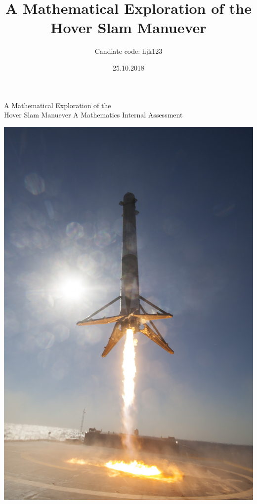 \documentclass[12pt]{article}
\begin{document}
    \title{A Mathematical Exploration of the Hover Slam Manuever}
    \date{25.10.2018}
    \author{Candiate code: hjk123}
    \begin{titlepage}
        \begin{center}
            \Huge{A Mathematical Exploration of the \\ Hover Slam Manuever}
            \break
            {\large A Mathematics Internal Assessment}
            \break
            

            \vspace{12mm}
            \includegraphics[scale=0.18]{hoverslam2.jpg}
            

        \end{center}
    \end{titlepage}
\end{document}

